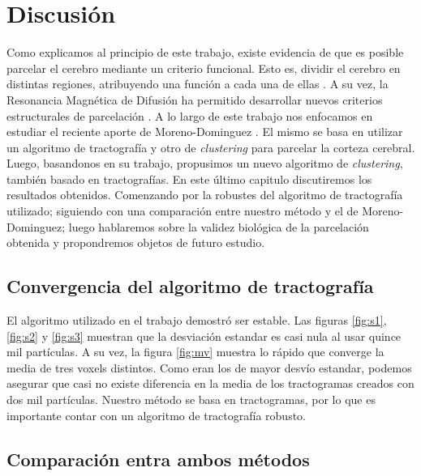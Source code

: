 \chapter{Discusi\'on} 

Como explicamos al principio de este trabajo, existe evidencia de que es posible
parcelar el cerebro mediante un criterio funcional. Esto es, dividir el cerebro
en distintas regiones, atribuyendo una funci\'on a cada una de ellas \cite{Greicius2003}.
A su vez, la Resonancia Magn\'etica de Difusi\'on ha permitido desarrollar nuevos 
criterios estructurales de parcelaci\'on \cite{Taylor1985}. A lo largo de este
trabajo nos enfocamos en estudiar el reciente aporte de Moreno-Dominguez 
\cite{Moreno-Dominguez2014}. El mismo se basa en utilizar un algoritmo de
tractograf\'ia y otro de \textit{clustering} para parcelar la corteza cerebral. 
Luego, basandonos en su trabajo, propusimos un nuevo algoritmo de \textit{clustering},
tambi\'en basado en tractograf\'ias. En este \'ultimo capitulo discutiremos los 
resultados obtenidos. Comenzando por la robustes del algoritmo de tractograf\'ia
utilizado; siguiendo con una comparaci\'on entre nuestro m\'etodo y el de 
Moreno-Dominguez; luego hablaremos sobre la validez biol\'ogica de la parcelaci\'on
obtenida y propondremos objetos de futuro estudio. \\


\section{Convergencia del algoritmo de tractograf\'ia}

El algoritmo utilizado en el trabajo demostr\'o ser estable. Las figuras 
\ref{fig:s1}, \ref{fig:s2} y \ref{fig:s3} muestran que la desviaci\'on estandar
es casi nula al usar quince mil part\'iculas. A su vez, la figura \ref{fig:mv}
muestra lo r\'apido que converge la media de tres voxels distintos. Como eran los 
de mayor desv\'io estandar, podemos asegurar que casi no existe diferencia en 
la media de los tractogramas creados con dos mil part\'iculas. Nuestro m\'etodo
se basa en tractogramas, por lo que es importante contar con un algoritmo de 
tractograf\'ia robusto.

\section{Comparaci\'on entra ambos m\'etodos}


